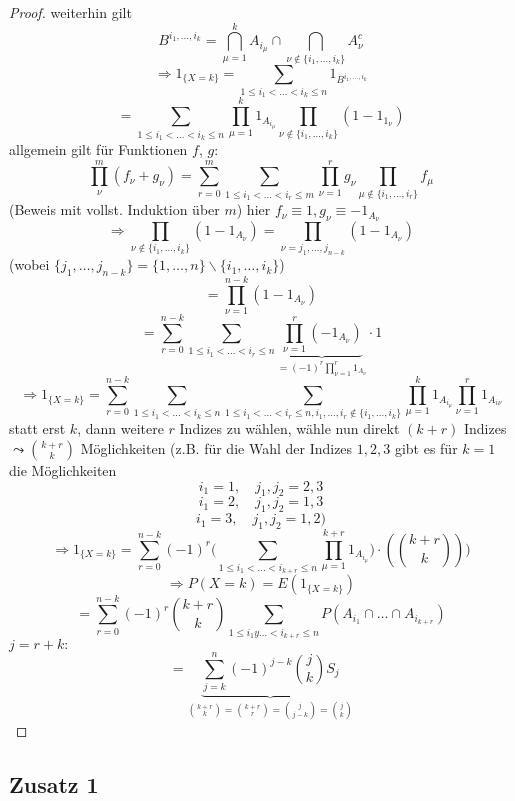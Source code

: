 \documentclass[a4paper,11pt,notitlepage]{report}
\begin{document}
\begin{proof}
	weiterhin gilt
	$$B^{i_1, \ldots, i_k}=\bigcap\limits_{\mu = 1}^k{A_{i_\mu}} \cap \bigcap\limits_{\nu \notin\{i_1, \ldots, i_k\}}{A_\nu^c}$$
	$$\Rightarrow 1_{\{X=k\}} = \sum\limits_{1 \leq i_1 < \ldots < i_k \leq n}{1_{B^{i_1, \ldots, i_k}}}$$
	$$= \sum\limits_{1 \leq i_1 < \ldots < i_k \leq n}{\prod\limits_{\mu=1}^k{1_{A_{i_\mu}}} \prod\limits_{\nu \notin\{i_1, \ldots, i_k\}}{(1-1_{1_\nu})}}$$
	allgemein gilt für  Funktionen $f$, $g$:
	$$\prod\limits_{\nu}^m{(f_\nu + g_\nu)} = \sum\limits_{r=0}^m{\sum\limits_{1 \leq i_1 < \ldots < i_r \leq m}{\prod\limits_{\nu = 1}^r{g_\nu} \prod\limits_{\mu \notin \{i_1, \ldots, i_r\}}{f_\mu}}}$$
	(Beweis mit vollst. Induktion über $m$)
	\newline
	hier $f_\nu \equiv 1, g_\nu \equiv -1_{A_\nu}$
	$$\Rightarrow \prod\limits_{\nu \notin\{i_1, \ldots, i_k\}}{(1-1_{A_\nu})} = \prod\limits_{\nu = j_1, \ldots, j_{n-k}}{(1-1_{A_\nu})}$$
		(wobei $\{j_1, \ldots, j_{n-k}\} = \{1,\ldots,n\} \backslash \{i_1, \ldots, i_k\}$)
	$$= \prod\limits_{\nu=1}^{n-k}{(1-1_{A_\nu})}$$
	$$= \sum\limits_{r=0}^{n-k}{\sum\limits_{1 \leq i_1 < \ldots < i_r \leq n}{\underbrace{\prod\limits_{\nu = 1}^r{(-1_{A_\nu})}}_{= (-1)^r \prod\limits_{\nu = 1}^r{1_{A_\nu}}} \cdot 1}}$$
	$$\Rightarrow 1_{\{X=k\}} = \sum\limits_{r=0}^{n-k}{\sum\limits_{1 \leq i_1 < \ldots < i_k \leq n}{\sum\limits_{1 \leq i_1 < \ldots < i_r \leq n, i_1, \ldots, i_r \notin \{i_1, \ldots, i_k\}}{\prod\limits_{\mu = 1}^k}{1_{A_{i_\mu}}}\prod\limits_{\nu = 1}^r{1_{A_{i \nu}}}}}$$
	statt erst $k$, dann weitere $r$ Indizes zu wählen, wähle nun direkt $(k+r)$ Indizes $\leadsto {k+r \choose k}$ Möglichkeiten
	\newline
	(z.B. für die Wahl der Indizes $1,2,3$ gibt es für $k=1$ die Möglichkeiten
	$$i_1 = 1, \quad j_1,j_2=2,3$$
	$$i_1 = 2, \quad j_1,j_2 = 1,3$$
	$$i_1 = 3, \quad j_1, j_2 = 1,2)$$
	$$\Rightarrow 1_{\{X=k\}} = \sum\limits_{r=0}^{n-k}{(-1)^r(\sum\limits_{1 \leq i_1 < \ldots < i_{k+r} \leq n}{\prod\limits_{\mu = 1}^{k+r}{1_{A_{i_\mu}}) \cdot ({k+r \choose k})})}}$$
	$$\Rightarrow P(X=k)=E(1_{\{X=k\}})$$
	$$= \sum\limits_{r=0}^{n-k}{(-1)^r{k+r \choose k} \sum\limits_{1 \leq i_1 y \ldots < i_{k+r}\leq n}{P(A_{i_1}\cap \ldots \cap A_{i_{k+r}})}}$$
	$j=r+k:$
	$$= \underbrace{\sum\limits_{j=k}^n{(-1)^{j-k}{j \choose k}S_j}}_{{k+r \choose k}={k+r \choose r} = {j \choose j-k} = {j \choose k}}$$
\end{proof}

\subsection{Zusatz 1}
\end{document}
